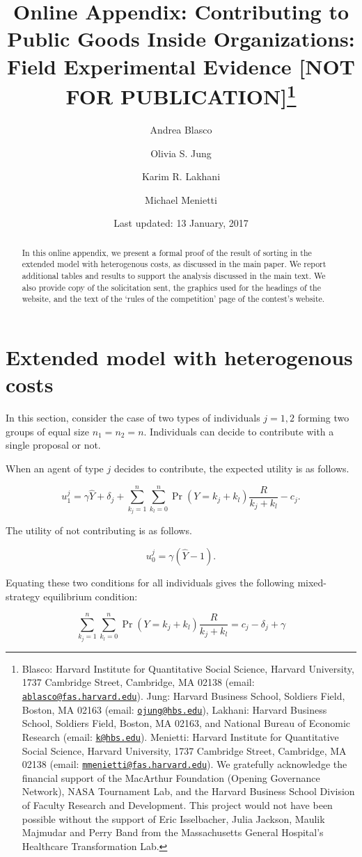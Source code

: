 \documentclass[11pt, titlepage]{article}
\institute{}
\title{Online Appendix: Contributing to Public Goods Inside Organizations:
Field Experimental Evidence {[}NOT FOR PUBLICATION{]}\thanks{Blasco: Harvard Institute for Quantitative Social Science, Harvard
University, 1737 Cambridge Street, Cambridge, MA 02138 (email:
\href{mailto:ablasco@fas.harvard.edu}{\nolinkurl{ablasco@fas.harvard.edu}}).
Jung: Harvard Business School, Soldiers Field, Boston, MA 02163 (email:
\href{mailto:ojung@hbs.edu}{\nolinkurl{ojung@hbs.edu}}), Lakhani:
Harvard Business School, Soldiers Field, Boston, MA 02163, and National
Bureau of Economic Research (email:
\href{mailto:k@hbs.edu}{\nolinkurl{k@hbs.edu}}). Menietti: Harvard
Institute for Quantitative Social Science, Harvard University, 1737
Cambridge Street, Cambridge, MA 02138 (email:
\href{mailto:mmenietti@fas.harvard.edu}{\nolinkurl{mmenietti@fas.harvard.edu}}).
We gratefully acknowledge the financial support of the MacArthur
Foundation (Opening Governance Network), NASA Tournament Lab, and the
Harvard Business School Division of Faculty Research and Development.
This project would not have been possible without the support of Eric
Isselbacher, Julia Jackson, Maulik Majmudar and Perry Band from the
Massachusetts General Hospital's Healthcare Transformation Lab.}}
\author{Andrea Blasco \and Olivia S. Jung \and Karim R. Lakhani \and Michael Menietti}
\date{Last updated: 13 January, 2017}
\begin{document}
\maketitle
\begin{abstract}
In this online appendix, we present a formal proof of the result of
sorting in the extended model with heterogenous costs, as discussed in
the main paper. We report additional tables and results to support the
analysis discussed in the main text. We also provide copy of the
solicitation sent, the graphics used for the headings of the website,
and the text of the `rules of the competition' page of the contest's
website.


\end{abstract}


\clearpage
\tableofcontents
\setcounter{tocdepth}{2}
\clearpage

\section{Extended model with heterogenous
costs}\label{extended-model-with-heterogenous-costs}

In this section, consider the case of two types of individuals \(j=1,2\)
forming two groups of equal size \(n_1=n_2=n\). Individuals can decide
to contribute with a single proposal or not.

When an agent of type \(j\) decides to contribute, the expected utility
is as follows.

\begin{equation}
 u_1^j = \gamma \hat Y + \delta_j + \sum_{k_j=1}^n \sum_{k_l=0}^n \Pr(Y=k_j+k_l) \frac{R}{k_j+k_l} - c_j.
\end{equation}

The utility of not contributing is as follows.

\begin{equation}
 u_0^j = \gamma (\hat Y - 1).
\end{equation}

Equating these two conditions for all individuals gives the following
mixed-strategy equilibrium condition:

\begin{equation}
\sum_{k_j=1}^n \sum_{k_l=0}^n \Pr(Y=k_j+k_l) \frac{R}{k_j+k_l} = c_j -\delta_j + \gamma
\end{equation}
\end{document}

